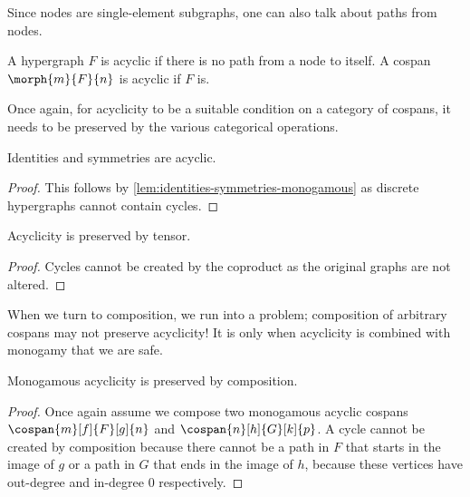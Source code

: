Since nodes are single-element subgraphs, one can also talk about paths from
nodes.

\begin{definition}
    A hypergraph \(F\) is acyclic if there is no path from a node to itself.
    A cospan \(\morph{m}{F}{n}\) is acyclic if \(F\) is.
\end{definition}

Once again, for acyclicity to be a suitable condition on a category of cospans,
it needs to be preserved by the various categorical operations.

\begin{lemma}\label{lem:identities-symmetries-monogamous-acyclic}
    Identities and symmetries are acyclic.
\end{lemma}
\begin{proof}
    This follows by \cref{lem:identities-symmetries-monogamous} as discrete
    hypergraphs cannot contain cycles.
\end{proof}

\begin{lemma}\label{lem:monogamous-acyclicity-preserved-tensor}
    Acyclicity is preserved by tensor.
\end{lemma}
\begin{proof}
    Cycles cannot be created by the coproduct as the original graphs are not
    altered.
\end{proof}

When we turn to composition, we run into a problem; composition of arbitrary
cospans may not preserve acyclicity!
It is only when acyclicity is combined with monogamy that we are safe.

\begin{lemma}\label{lem:monogamous-acyclicity-preserved-composition}
    Monogamous acyclicity is preserved by composition.
\end{lemma}
\begin{proof}
    Once again assume we compose two monogamous acyclic cospans \(
    \cospan{m}[f]{F}[g]{n}
    \) and \(
    \cospan{n}[h]{G}[k]{p}
    \).
    A cycle cannot be created by composition because there cannot be a path in
    \(F\) that starts in the image of \(g\) or a path in \(G\) that ends in the
    image of \(h\), because these vertices have out-degree and in-degree \(0\)
    respectively.
\end{proof}


